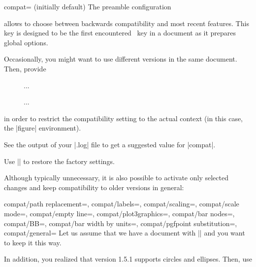 \begin{pgfplotskey}{compat= (initially default)}
	The preamble configuration
\begin{codeexample}
\usepackage{pgfplots}
\pgfplotsset{compat=1.14}
\end{codeexample}
	allows to choose between backwards compatibility and most recent features. This key is designed to be the first encountered \PGFPlots\ key in a document as it prepares global options.

	Occasionally, you might want to use different versions in the same document. Then, provide
\begin{codeexample}
\begin{figure}
	\pgfplotsset{compat=1.4}
	...
	\caption{...}
\end{figure}
\end{codeexample}
	\noindent in order to restrict the compatibility setting to the actual context (in this case, the |figure| environment).

	See the output of your |.log| file to get a suggested value for |compat|.

	Use |\pgfplotsset{compat=default}| to restore the factory settings.

	Although typically unnecessary, it is also possible to activate only selected changes and keep compatibility to older versions in general:
	\begin{pgfplotskeylist}{%
		compat/path replacement=,%
		compat/labels=,%
		compat/scaling=,%
		compat/scale mode=,%
		compat/empty line=,%
		compat/plot3graphics=,%
		compat/bar nodes=,%
		compat/BB=,%
		compat/bar width by units=,%
		compat/pgfpoint substitution=,%
		compat/general=%
	}
	Let us assume that we have a document with |\pgfplotsset{compat=1.3}| and you want to keep it this way.

	In addition, you realized that version 1.5.1 supports circles and ellipses. Then, use
\begin{codeexample}[]
\pgfplotsset{compat=1.3,compat/path replacement=1.5.1}
\end{codeexample}
	

\end{pgfplotskeylist}
\end{pgfplotskey}
